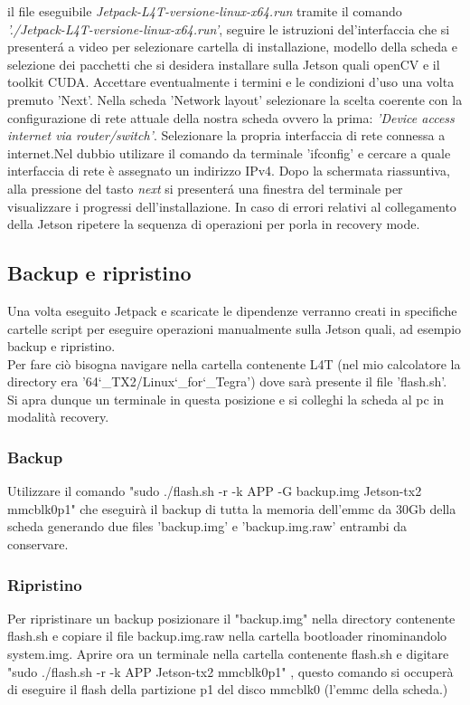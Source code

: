 \documentclass[a4paper]{article}
\begin{document}
il file eseguibile \textit{Jetpack-L4T-versione-linux-x64.run} tramite il comando \textit{'./Jetpack-L4T-versione-linux-x64.run'}, seguire le istruzioni del'interfaccia che si presenterá a video
per selezionare cartella di installazione, modello della scheda e selezione dei pacchetti che si desidera installare sulla Jetson quali openCV e il toolkit CUDA.
Accettare eventualmente i termini e le condizioni d'uso una volta premuto 'Next'.
Nella scheda 'Network layout' selezionare la scelta coerente con la configurazione di rete attuale della nostra scheda ovvero la prima: \textit{'Device access internet via router/switch'}.
Selezionare la propria interfaccia di rete connessa a internet.Nel dubbio utilizare il comando da terminale 'ifconfig' e cercare a quale interfaccia di rete è assegnato un indirizzo IPv4.
Dopo la schermata riassuntiva, alla pressione del tasto \textit{next} si presenterá una finestra del terminale per visualizzare i progressi dell'installazione.
In caso di errori relativi al collegamento della Jetson ripetere la sequenza di operazioni per porla in recovery mode.


\subsection{Backup e ripristino}
Una volta eseguito Jetpack e scaricate le dipendenze verranno creati in specifiche cartelle script per eseguire operazioni manualmente sulla Jetson
quali, ad esempio backup e ripristino.\\
Per fare ciò bisogna navigare nella cartella contenente L4T (nel mio calcolatore la directory era '64\char`_TX2/Linux\char`_for\char`_Tegra') dove sarà presente il file 'flash.sh'.\\
Si apra dunque un terminale in questa posizione e si colleghi la scheda al pc in modalità recovery.

\subsubsection{Backup}
Utilizzare il comando "sudo ./flash.sh -r -k APP -G backup.img Jetson-tx2 mmcblk0p1" che eseguirà il backup di tutta la memoria dell'emmc da 30Gb della scheda
generando due files 'backup.img' e 'backup.img.raw' entrambi da conservare.

\subsubsection{Ripristino}
Per ripristinare un backup posizionare il "backup.img" nella directory contenente flash.sh e copiare il file backup.img.raw nella cartella bootloader rinominandolo system.img.
Aprire ora un terminale nella cartella contenente flash.sh e digitare "sudo ./flash.sh -r -k APP Jetson-tx2 mmcblk0p1" , questo comando si occuperà di eseguire il flash della partizione p1 del disco mmcblk0 (l'emmc della scheda.)\\
\end{document}
